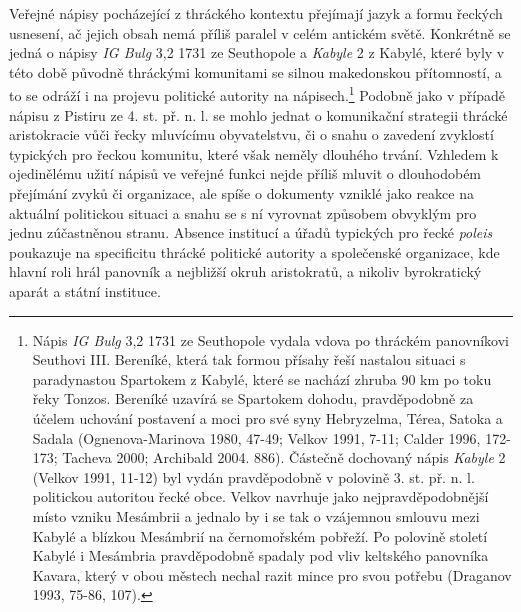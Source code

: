 Veřejné nápisy pocházející z thráckého kontextu přejímají jazyk a formu řeckých usnesení, ač jejich obsah nemá příliš paralel v celém antickém světě. Konkrétně se jedná o nápisy {\em IG Bulg} 3,2 1731 ze Seuthopole a {\em Kabyle} 2 z Kabylé, které byly v této době původně thráckými komunitami se silnou makedonskou přítomností, a to se odráží i na projevu politické autority na nápisech.\footnote{Nápis {\em IG Bulg} 3,2 1731 ze Seuthopole vydala vdova po thráckém panovníkovi Seuthovi III. Bereníké, která tak formou přísahy řeší nastalou situaci s paradynastou Spartokem z Kabylé, které se nachází zhruba 90 km po toku řeky Tonzos. Bereníké uzavírá se Spartokem dohodu, pravděpodobně za účelem uchování postavení a moci pro své syny Hebryzelma, Térea, Satoka a Sadala (Ognenova-Marinova 1980, 47-49; Velkov 1991, 7-11; Calder 1996, 172-173; Tacheva 2000; Archibald 2004. 886). Částečně dochovaný nápis {\em Kabyle} 2 (Velkov 1991, 11-12) byl vydán pravděpodobně v polovině 3. st. př. n. l. politickou autoritou řecké obce. Velkov navrhuje jako nejpravděpodobnější místo vzniku Mesámbrii a jednalo by i se tak o vzájemnou smlouvu mezi Kabylé a blízkou Mesámbrií na černomořském pobřeží. Po polovině století Kabylé i Mesámbria pravděpodobně spadaly pod vliv keltského panovníka Kavara, který v obou městech nechal razit mince pro svou potřebu (Draganov 1993, 75-86, 107).} Podobně jako v případě nápisu z Pistiru ze 4. st. př. n. l. se mohlo jednat o komunikační strategii thrácké aristokracie vůči řecky mluvícímu obyvatelstvu, či o snahu o zavedení zvyklostí typických pro řeckou komunitu, které však neměly dlouhého trvání. Vzhledem k ojedinělému užití nápisů ve veřejné funkci nejde příliš mluvit o dlouhodobém přejímání zvyků či organizace, ale spíše o dokumenty vzniklé jako reakce na aktuální politickou situaci a snahu se s ní vyrovnat způsobem obvyklým pro jednu zúčastněnou stranu. Absence institucí a úřadů typických pro řecké {\em poleis} poukazuje na specificitu thrácké politické autority a společenské organizace, kde hlavní roli hrál panovník a nejbližší okruh aristokratů, a nikoliv byrokratický aparát a státní instituce.

